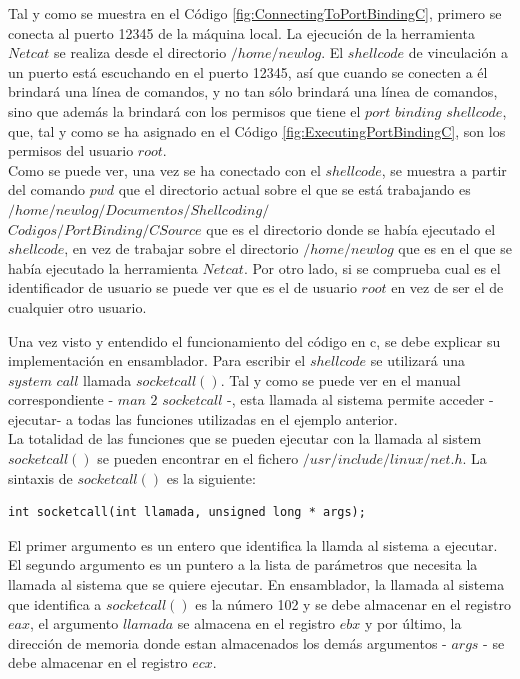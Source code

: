 \documentclass [titlepage, 12pt]{article}
\begin{document}
Tal y como se muestra en el C\'odigo \ref{fig:ConnectingToPortBindingC}, primero se conecta al puerto 12345 de la m\'aquina local. La ejecuci\'on de la herramienta $Netcat$ se realiza desde el directorio $/home/newlog$. El $shellcode$ de vinculaci\'on a un puerto est\'a escuchando en el puerto 12345, as\'i que cuando se conecten a \'el brindar\'a una l\'inea de comandos, y no tan s\'olo brindar\'a una l\'inea de comandos, sino que adem\'as la brindar\'a con los permisos que tiene el $port$ $binding$ $shellcode$, que, tal y como se ha asignado en el C\'odigo \ref{fig:ExecutingPortBindingC}, son los permisos del usuario $root$.\\
Como se puede ver, una vez se ha conectado con el $shellcode$, se muestra a partir del comando $pwd$ que el directorio actual sobre el que se est\'a trabajando es $/home/newlog/Documentos/Shellcoding/$\\$Codigos/PortBinding/CSource$ que es el directorio donde se hab\'ia ejecutado el $shellcode$, en vez de trabajar sobre el directorio $/home/newlog$ que es en el que se hab\'ia ejecutado la herramienta $Netcat$. Por otro lado, si se comprueba cual es el identificador de usuario se puede ver que es el de usuario $root$ en vez de ser el de cualquier otro usuario.\bigskip


Una vez visto y entendido el funcionamiento del c\'odigo en c, se debe explicar su implementaci\'on en ensamblador. Para escribir el $shellcode$ se utilizar\'a una $system$ $call$ llamada $socketcall()$. Tal y como se puede ver en el manual correspondiente - $man$ $2$ $socketcall$ -, esta llamada al sistema permite acceder -ejecutar- a todas las funciones utilizadas en el ejemplo anterior.\\
La totalidad de las funciones que se pueden ejecutar con la llamada al sistem $socketcall()$ se pueden encontrar en el fichero $/usr/include/linux/net.h$. La sintaxis de $socketcall()$ es la siguiente:

\begin{verbatim}
int socketcall(int llamada, unsigned long * args);
\end{verbatim}

El primer argumento es un entero que identifica la llamda al sistema a ejecutar. El segundo argumento es un puntero a la lista de par\'ametros que necesita la llamada al sistema que se quiere ejecutar. En ensamblador, la llamada al sistema que identifica a $socketcall()$ es la n\'umero 102 y se debe almacenar en el registro $eax$, el argumento $llamada$ se almacena en el registro $ebx$ y por \'ultimo, la direcci\'on de memoria donde estan almacenados los dem\'as argumentos - $args$ - se debe almacenar en el registro $ecx$.\\
\end{document}
